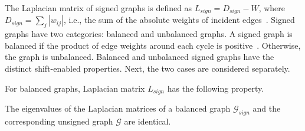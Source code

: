 \documentclass[journal]{IEEEtran}
\begin{document}
The Laplacian matrix of signed graphs is defined as $L_{sign}=D_{sign}-W$, where $D_{sign}=\sum_j|w_{ij}|$, i.e., the sum of the absolute weights of incident edges~\cite{Dittrich20200signedgraph,liu2020generalized}. 
Signed graphs have two categories: balanced and unbalanced graphs. %
A signed graph is balanced if the product of edge weights around each cycle is positive~\cite{harary1953notion}. Otherwise, the graph is unbalanced. 
Balanced and unbalanced signed graphs have the distinct shift-enabled properties. Next, the two cases are considered separately.

For balanced graphs, Laplacian matrix $L_{sign}$ has the following property.
\begin{Thm}{\label{Thm balance_spectral}}
	The eigenvalues of the Laplacian matrices of a balanced graph $\mathcal{G}_{sign}$ and the corresponding unsigned graph $\mathcal{G}$ %
	are identical. 
\end{Thm}
\end{document}
